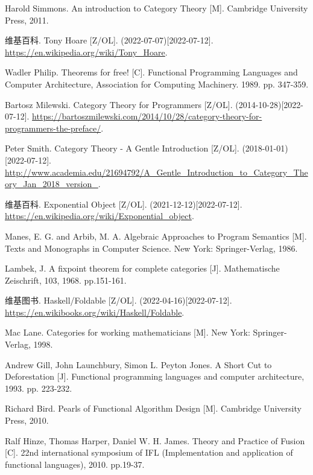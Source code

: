 \documentclass[UTF8]{article}
\begin{document}
\begin{thebibliography}{99}
Harold Simmons. An introduction to Category Theory [M]. Cambridge University Press, 2011. %

维基百科. Tony Hoare [Z/OL]. (2022-07-07)[2022-07-12]. \url{https://en.wikipedia.org/wiki/Tony_Hoare}.

Wadler Philip. Theorems for free! [C]. Functional Programming Languages and Computer Architecture, Association for Computing Machinery. 1989. pp. 347-359.

Bartosz Milewski. Category Theory for Programmers [Z/OL]. (2014-10-28)[2022-07-12]. \url{https://bartoszmilewski.com/2014/10/28/category-theory-for-programmers-the-preface/}.

Peter Smith. Category Theory - A Gentle Introduction [Z/OL]. (2018-01-01)[2022-07-12]. \url{http://www.academia.edu/21694792/A_Gentle_Introduction_to_Category_Theory_Jan_2018_version_}.

维基百科. Exponential Object [Z/OL]. (2021-12-12)[2022-07-12]. \url{https://en.wikipedia.org/wiki/Exponential_object}.

Manes, E. G. and Arbib, M. A. Algebraic Approaches to Program Semantics [M]. Texts and Monographs in Computer Science. New York: Springer-Verlag, 1986.

Lambek, J. A fixpoint theorem for complete categories [J]. Mathematische Zeischrift, 103, 1968. pp.151-161.

维基图书. Haskell/Foldable [Z/OL]. (2022-04-16)[2022-07-12]. \url{https://en.wikibooks.org/wiki/Haskell/Foldable}.

Mac Lane. Categories for working mathematicians [M]. New York: Springer-Verlag, 1998. %


Andrew Gill, John Launchbury, Simon L. Peyton Jones. A Short Cut to Deforestation [J]. Functional programming languages and computer architecture, 1993. pp. 223-232.

Richard Bird. Pearls of Functional Algorithm Design [M]. Cambridge University Press, 2010. %

Ralf Hinze, Thomas Harper, Daniel W. H. James. Theory and Practice of Fusion [C]. 22nd international symposium of IFL (Implementation and application of functional languages), 2010. pp.19-37.


\end{thebibliography}
\end{document}
